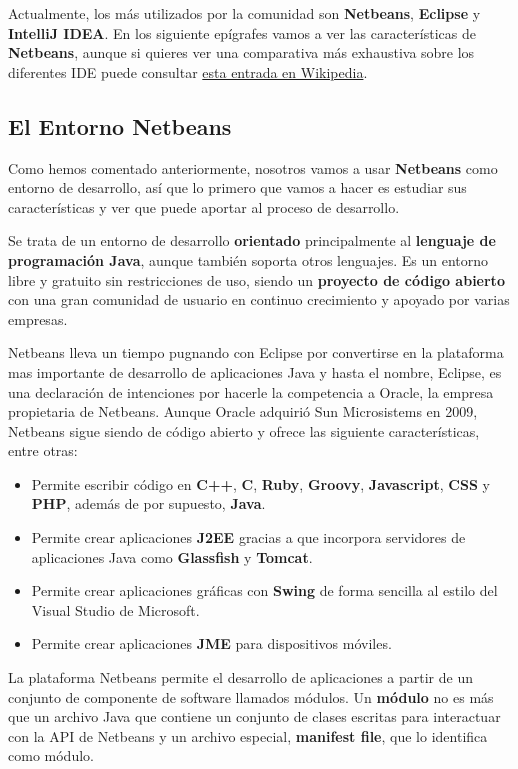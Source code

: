Actualmente, los más utilizados por la comunidad son \textbf{Netbeans}, \textbf{Eclipse} y \textbf{IntelliJ IDEA}. En los siguiente epígrafes vamos a ver las características de \textbf{Netbeans}, aunque si quieres ver una comparativa más exhaustiva sobre los diferentes IDE puede consultar \href{https://en.wikipedia.org/wiki/Comparison_of_integrated_development_environments#Java}{esta entrada en Wikipedia}.

\subsection{El Entorno Netbeans}
Como hemos comentado anteriormente, nosotros vamos a usar \textbf{Netbeans} como entorno de desarrollo, así que lo primero que vamos a hacer es estudiar sus características y ver que puede aportar al proceso de desarrollo.

Se trata de un entorno de desarrollo \textbf{orientado} principalmente al \textbf{lenguaje de programación Java}, aunque también soporta otros lenguajes. Es un entorno libre y gratuito sin restricciones de uso, siendo un \textbf{proyecto de código abierto} con una gran comunidad de usuario en continuo crecimiento y apoyado por varias empresas.

Netbeans lleva un tiempo pugnando con Eclipse por convertirse en la plataforma mas importante de desarrollo de aplicaciones Java y hasta el nombre, Eclipse, es una declaración de intenciones por hacerle la competencia a Oracle, la empresa propietaria de Netbeans. Aunque Oracle adquirió Sun Microsistems en 2009, Netbeans sigue siendo de código abierto y ofrece las siguiente características, entre otras:

\begin{itemize}
    \item Permite escribir código en \textbf{C++}, \textbf{C}, \textbf{Ruby}, \textbf{Groovy}, \textbf{Javascript}, \textbf{CSS} y \textbf{PHP}, además de por supuesto, \textbf{Java}.
    \item Permite crear aplicaciones \textbf{J2EE} gracias a que incorpora servidores de aplicaciones Java como \textbf{Glassfish} y \textbf{Tomcat}.
    \item Permite crear aplicaciones gráficas con \textbf{Swing} de forma sencilla al estilo del Visual Studio de Microsoft.
    \item Permite crear aplicaciones \textbf{JME} para dispositivos móviles.
\end{itemize}

La plataforma Netbeans permite el desarrollo de aplicaciones a partir de un conjunto de componente de software llamados módulos. Un \textbf{módulo} no es más que un archivo Java que contiene un conjunto de clases escritas para interactuar con la API de Netbeans y un archivo especial, \textbf{manifest file}, que lo identifica como módulo.


